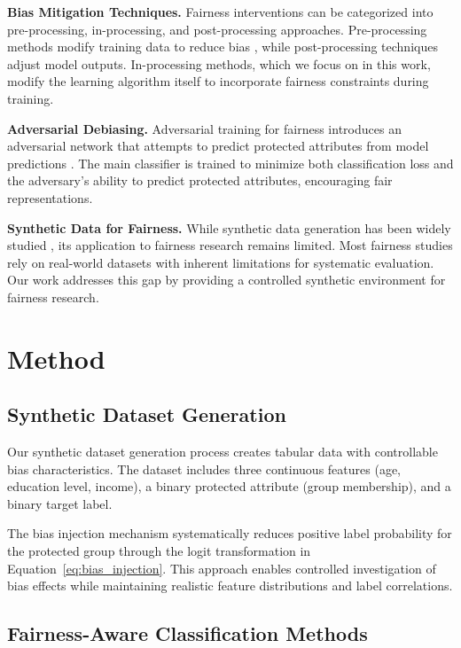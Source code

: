\documentclass{article}
\begin{document}
\textbf{Bias Mitigation Techniques.} Fairness interventions can be categorized into pre-processing, in-processing, and post-processing approaches. Pre-processing methods modify training data to reduce bias \cite{zemel2013learning}, while post-processing techniques adjust model outputs. In-processing methods, which we focus on in this work, modify the learning algorithm itself to incorporate fairness constraints during training.

\textbf{Adversarial Debiasing.} Adversarial training for fairness introduces an adversarial network that attempts to predict protected attributes from model predictions \cite{zhang2018adversarial}. The main classifier is trained to minimize both classification loss and the adversary's ability to predict protected attributes, encouraging fair representations.

\textbf{Synthetic Data for Fairness.} While synthetic data generation has been widely studied \cite{jordon2022synthetic}, its application to fairness research remains limited. Most fairness studies rely on real-world datasets with inherent limitations for systematic evaluation. Our work addresses this gap by providing a controlled synthetic environment for fairness research.

\section{Method}



\subsection{Synthetic Dataset Generation}

Our synthetic dataset generation process creates tabular data with controllable bias characteristics. The dataset includes three continuous features (age, education level, income), a binary protected attribute (group membership), and a binary target label.

The bias injection mechanism systematically reduces positive label probability for the protected group through the logit transformation in Equation~\ref{eq:bias_injection}. This approach enables controlled investigation of bias effects while maintaining realistic feature distributions and label correlations.

\subsection{Fairness-Aware Classification Methods}
\end{document}
